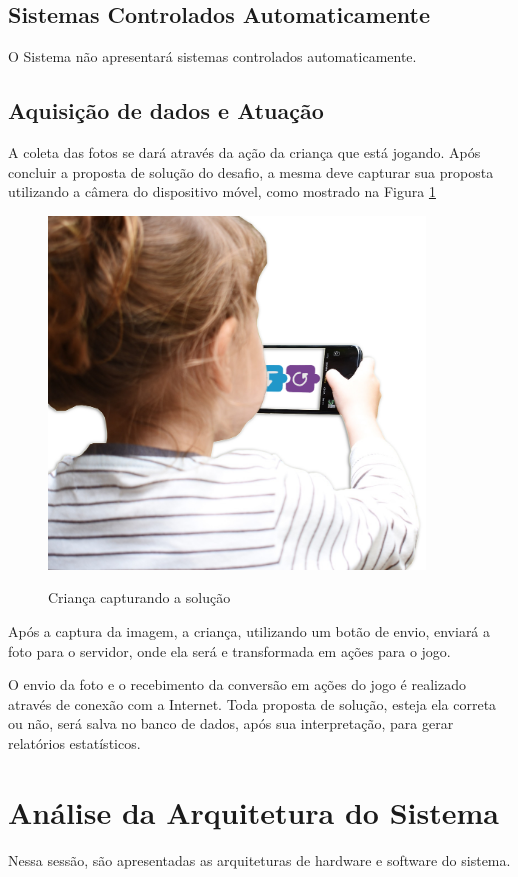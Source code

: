     \subsection{Sistemas Controlados Automaticamente}
    O Sistema não apresentará sistemas controlados automaticamente.
    
    \subsection{Aquisição de dados e Atuação}
    A coleta das fotos se dará através da ação da criança que está jogando. Após concluir a proposta de solução do desafio, a mesma deve capturar sua proposta utilizando a câmera do dispositivo móvel, como mostrado na Figura \ref{figura:crianca_blocos}
    
    \begin{figure}[H]
        \caption{Criança capturando a solução}
        \centering
        \includegraphics[width=10cm]{Imagens/Cap3/CriançaBlocos.jpg}
        \label{figura:crianca_blocos}
    \end{figure}
    
    Após a captura da imagem, a criança, utilizando um botão de envio, enviará a foto para o servidor, onde ela será e transformada em ações para o jogo.
    
    O envio da foto e o recebimento da conversão em ações do jogo é realizado através de conexão com a Internet.
    Toda proposta de solução, esteja ela correta ou não, será salva no banco de dados, após sua interpretação, para gerar relatórios estatísticos.


\section{Análise da Arquitetura do Sistema}
    Nessa sessão, são apresentadas as arquiteturas de hardware e software do sistema.

